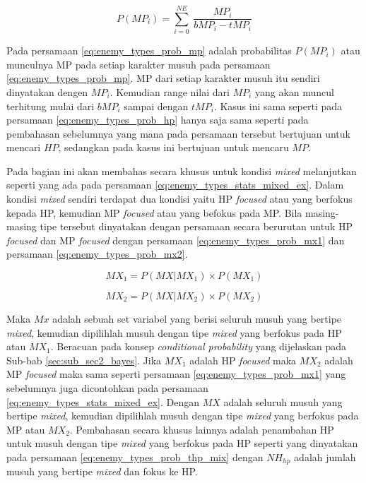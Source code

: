 \begin{equation}\label{eq:enemy_types_prob_mp}
P(MP_{i}) = \sum_{i=0}^{NE}\ \frac{MP_{i}}{bMP_{i} - tMP_{i}}
\end{equation}

Pada persamaan \ref{eq:enemy_types_prob_mp} adalah probabilitas $P(MP_{i})$ atau munculnya MP pada setiap karakter musuh pada persamaan \ref{eq:enemy_types_prob_mp}. MP dari setiap karakter musuh itu sendiri dinyatakan dengen $MP_{i}$. Kemudian range nilai dari $MP_{i}$ yang akan muncul terhitung mulai dari $bMP_{i}$ sampai dengan $tMP_{i}$. Kasus ini sama seperti pada persamaan \ref{eq:enemy_types_prob_hp} hanya saja sama seperti pada pembahasan sebelumnya yang mana pada persamaan tersebut bertujuan untuk mencari $HP$, sedangkan pada kasus ini bertujuan untuk mencaru $MP$.
\vspace{1ex}

Pada bagian ini akan membahas secara khusus untuk kondisi \textit{mixed} melanjutkan seperti yang ada pada persamaan \ref{eq:enemy_types_stats_mixed_ex}. Dalam kondisi \textit{mixed} sendiri terdapat dua kondisi yaitu HP \textit{focused} atau yang berfokus kepada HP, kemudian MP \textit{focused} atau yang befokus pada MP. Bila masing-masing tipe tersebut dinyatakan dengan persamaan secara berurutan untuk HP \textit{focused} dan MP \textit{focused} dengan persamaan \ref{eq:enemy_types_prob_mx1} dan persamaan \ref{eq:enemy_types_prob_mx2}. 
\vspace{1ex}

\begin{equation}\label{eq:enemy_types_prob_mx1}
MX_{1} = P(MX | MX_{1}) \times P(MX_{1})
\end{equation}

\begin{equation}\label{eq:enemy_types_prob_mx2}
MX_{2} = P(MX | MX_{2}) \times P(MX_{2})
\end{equation}

Maka $Mx$ adalah sebuah set variabel yang berisi seluruh musuh yang bertipe \textit{mixed}, kemudian dipilihlah musuh dengan tipe \textit{mixed} yang berfokus pada HP atau $MX_{1}$. Beracuan pada konsep \textit{conditional probability} yang dijelaskan pada Sub-bab \ref{sec:sub_sec2_bayes}. Jika $MX_{1}$ adalah HP \textit{focused} maka  $MX_{2}$ adalah MP \textit{focused} maka sama seperti persamaan \ref{eq:enemy_types_prob_mx1} yang sebelumnya juga dicontohkan pada persamaan \ref{eq:enemy_types_stats_mixed_ex}. Dengan $MX$ adalah seluruh musuh yang bertipe \textit{mixed}, kemudian dipilihlah musuh dengan tipe \textit{mixed} yang berfokus pada MP atau $MX_{2}$. Pembahasan secara khusus lainnya adalah penambahan HP untuk musuh dengan tipe \textit{mixed} yang berfokus pada HP seperti yang dinyatakan pada persamaan \ref{eq:enemy_types_prob_thp_mix} dengan $NH_{hp}$ adalah jumlah musuh yang bertipe \textit{mixed} dan fokus ke HP. 
\vspace{1ex}

